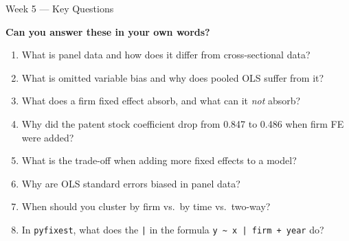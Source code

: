 \documentclass[9pt,aspectratio=169]{beamer}
\begin{document}
\begin{frame}{Week 5 --- Key Questions}

\textbf{Can you answer these in your own words?}

\begin{enumerate}
    \item What is panel data and how does it differ from cross-sectional data?
    \item What is omitted variable bias and why does pooled OLS suffer from it?
    \item What does a firm fixed effect absorb, and what can it \textit{not} absorb?
    \item Why did the patent stock coefficient drop from 0.847 to 0.486 when firm FE were added?
    \item What is the trade-off when adding more fixed effects to a model?
    \item Why are OLS standard errors biased in panel data?
    \item When should you cluster by firm vs.\ by time vs.\ two-way?
    \item In \texttt{pyfixest}, what does the \texttt{|} in the formula \texttt{y \textasciitilde{} x | firm + year} do?
\end{enumerate}

\end{frame}
\end{document}
